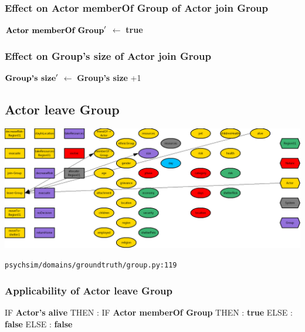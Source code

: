 \documentclass{article}%
\begin{document}
%
\subsubsection{Effect on Actor memberOf Group of Actor join Group}%
\label{ssubsec:Effect on Actor memberOf Group of Actor join Group}%
\begin{flushleft}%
$\mbox{\textbf{Actor memberOf Group}} '$%
$\leftarrow$%
\textbf{true}%
\end{flushleft}

%
\subsubsection{Effect on Group's size of Actor join Group}%
\label{ssubsec:Effect on Group's size of Actor join Group}%
\begin{flushleft}%
$\mbox{\textbf{Group's size}} '$%
$\leftarrow$%
\textbf{Group's size}%
+1%
\end{flushleft}

%
\subsection{Actor leave Group}%
\label{subsec:Actor leave Group}%
\includegraphics[width=\textwidth]{images/Actor-leave-Group.png}%
\begin{flushleft}%
\verb|psychsim/domains/groundtruth/group.py:119|%
\end{flushleft}%
\subsubsection{Applicability of Actor leave Group}%
\label{ssubsec:Applicability of Actor leave Group}%
\begin{flushleft}%
IF %
\textbf{Actor's alive}%
\linebreak%
\hspace*{2em}%
THEN %
: %
IF %
\textbf{Actor memberOf Group}%
\linebreak%
\hspace*{4em}%
THEN %
: %
\textbf{true}%
\linebreak%
\hspace*{4em}%
ELSE %
: %
\textbf{false}%
\linebreak%
\hspace*{2em}%
ELSE %
: %
\textbf{false}%
\end{flushleft}
\end{document}
